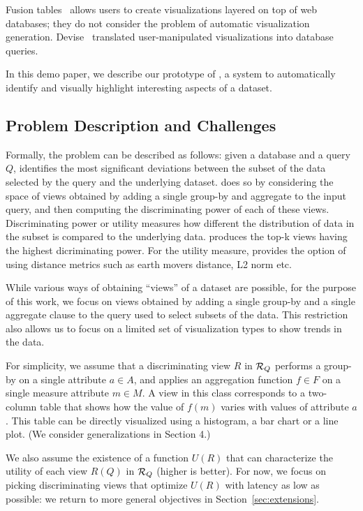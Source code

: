Fusion tables~\cite{DBLP:conf/sigmod/GonzalezHJLMSSG10} allows users to create
visualizations layered on top of web databases; they do not consider the problem
of automatic visualization generation.
Devise~\cite{DBLP:conf/sigmod/LivnyRBCDLMW97} translated user-manipulated
visualizations into database queries.

In this demo paper, we describe our prototype of \SeeDB, a system to
automatically identify and visually highlight interesting aspects of a dataset. 

\subsection{Problem Description and Challenges}
\label{problem_description}

Formally, the problem can be described as follows: given a database and a query
$Q$, \SeeDB identifies the most significant deviations between the subset of the
data selected by the query and the underlying dataset. \SeeDB does so by
considering the space of views obtained by adding a single group-by and
aggregate to the input query, and then computing the discriminating power of
each of these views. Discriminating power or utility measures how different the
distribution of data in the subset is compared to the underlying data. \SeeDB
produces the top-k views having the highest dicriminating power. For the utility
measure, \SeeDB provides the option of using distance metrics such as earth
movers distance, L2 norm etc.

While various ways of obtaining ``views'' of a dataset are possible, for the
purpose of this work, we focus on views obtained by adding a single group-by and
a single aggregate clause to the query used to select subsets of the data. This
restriction also allows us to focus on a limited set of visualization types to
show trends in the data.

For simplicity, we assume that a discriminating view 
$R$ in $\mathcal{R}_Q$ performs a group-by on a single attribute $a \in A$, 
and applies an aggregation function $f \in F$ 
on a single measure attribute $m \in M$. 
A view in this class corresponds to a two-column table 
that shows how the value of $f(m)$ varies with values of attribute $a$. 
This table can be directly visualized using a histogram, 
a bar chart or a line plot. (We consider generalizations in Section 4.)

We also assume the existence of a function $U(R)$ that can characterize the
utility of each view $R(Q)$ in $\mathcal{R}_Q$ (higher is better). For now, we focus
on picking discriminating views that optimize $U(R)$ with latency as low as
possible: we return to more general objectives in Section~\ref{sec:extensions}.

